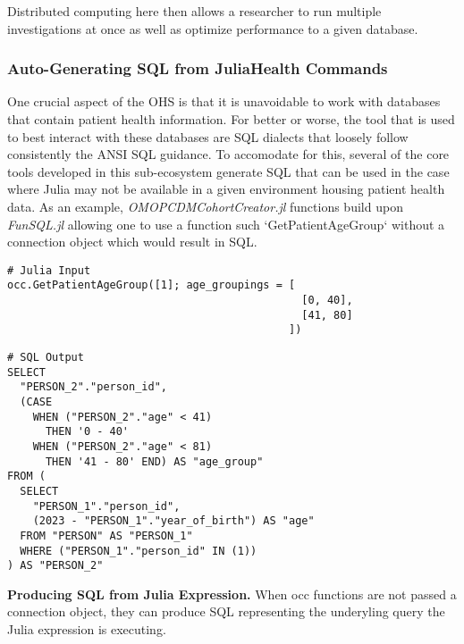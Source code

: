 \documentclass{juliacon}
\begin{document}
Distributed computing here then allows a researcher to run multiple investigations at once as well as optimize performance to a given database.

\subsubsection{Auto-Generating SQL from JuliaHealth Commands}

One crucial aspect of the OHS is that it is unavoidable to work with databases that contain patient health information.
For better or worse, the tool that is used to best interact with these databases are SQL dialects that loosely follow consistently the ANSI SQL guidance.
To accomodate for this, several of the core tools developed in this sub-ecosystem generate SQL that can be used in the case where Julia may not be available in a given environment housing patient health data.
As an example, \textit{OMOPCDMCohortCreator.jl} functions build upon \textit{FunSQL.jl} allowing one to use a function such `GetPatientAgeGroup` without a connection object which would result in SQL.

\begin{listing}[!ht]
\begin{verbatim}
# Julia Input
occ.GetPatientAgeGroup([1]; age_groupings = [
                                              [0, 40], 
                                              [41, 80]
                                            ])

\end{verbatim}

\begin{verbatim}
# SQL Output
SELECT
  "PERSON_2"."person_id",
  (CASE 
    WHEN ("PERSON_2"."age" < 41) 
      THEN '0 - 40' 
    WHEN ("PERSON_2"."age" < 81) 
      THEN '41 - 80' END) AS "age_group"
FROM (
  SELECT
    "PERSON_1"."person_id",
    (2023 - "PERSON_1"."year_of_birth") AS "age"
  FROM "PERSON" AS "PERSON_1"
  WHERE ("PERSON_1"."person_id" IN (1))
) AS "PERSON_2"
\end{verbatim}
\caption{\textbf{Producing SQL from Julia Expression.} When occ functions are not passed a connection object, they can produce SQL representing the underyling query the Julia expression is executing.}
\label{listing:julia_sql}
\end{listing}
\end{document}
